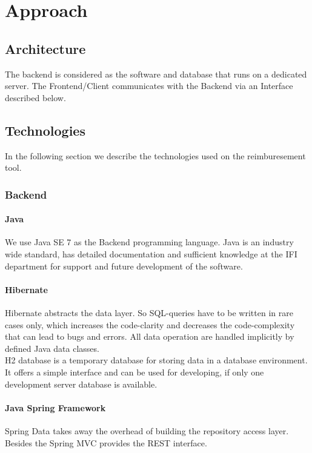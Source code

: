 \chapter{Approach}

\section{Architecture}

The backend is considered as the software and database that runs on a dedicated server. The Frontend/Client communicates with the Backend via an Interface described below.

\section{Technologies}

In the following section we describe the technologies used on the reimburesement tool.

\subsection{Backend}

\subsubsection{Java}
We use Java SE 7 as the Backend programming language. Java is an industry wide standard, has detailed documentation and sufficient knowledge at the IFI department for support and future development of the software.

\subsubsection{Hibernate}
Hibernate abstracts the data layer. So SQL-queries have to be written in rare cases only, which increases the code-clarity and decreases the code-complexity that can lead to bugs and errors. All data operation are handled implicitly by defined Java data classes.\\
H2 database is a temporary database for storing data in a database environment. It offers a simple interface and can be used for developing, if only one development server database is available. \cite{hibernate}

\subsubsection{Java Spring Framework}
Spring Data takes away the overhead of building the repository access layer. Besides the Spring MVC provides the REST interface. \cite{spring}

